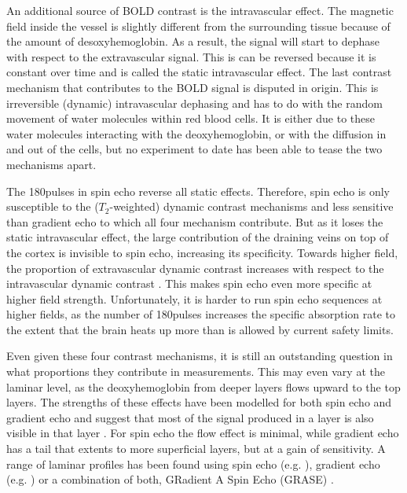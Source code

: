 An additional source of BOLD contrast is the intravascular effect. The magnetic field inside the vessel is slightly different from the surrounding tissue because of the amount of desoxyhemoglobin. As a result, the signal will start to dephase with respect to the extravascular signal. This is can be reversed because it is constant over time and is called the static intravascular effect. The last contrast mechanism that contributes to the BOLD signal is disputed in origin. This is irreversible (dynamic) intravascular dephasing and has to do with the random movement of water molecules within red blood cells. It is either due to these water molecules interacting with the deoxyhemoglobin, or with the diffusion in and out of the cells, but no experiment to date has been able to tease the two mechanisms apart.

The 180\textdegree pulses in spin echo reverse all static effects. Therefore, spin echo is only susceptible to the ($T_2$-weighted) dynamic contrast mechanisms and less sensitive than gradient echo to which all four mechanism contribute. But as it loses the static intravascular effect, the large contribution of the draining veins on top of the cortex is invisible to spin echo, increasing its specificity. Towards higher field, the proportion of extravascular dynamic contrast increases with respect to the intravascular dynamic contrast \cite{Norris2002,Jochimsen2004,Norris2006}. This makes spin echo even more specific at higher field strength. Unfortunately, it is harder to run spin echo sequences at higher fields, as the number of 180\textdegree pulses increases the specific absorption rate to the extent that the brain heats up more than is allowed by current safety limits.

Even given these four contrast mechanisms, it is still an outstanding question in what proportions they contribute in measurements. This may even vary at the laminar level, as the deoxyhemoglobin from deeper layers flows upward to the top layers. The strengths of these effects have been modelled for both spin echo and gradient echo and suggest that most of the signal produced in a layer is also visible in that layer \cite{Markuerkiaga2016,Uludag2017}. For spin echo the flow effect is minimal, while gradient echo has a tail that extents to more superficial layers, but at a gain of sensitivity. A range of laminar profiles has been found using spin echo (e.g. \cite{Zhao2004,Harel2006,Goense2006}), gradient echo (e.g. \cite{Polimeni2010,DeMartino2013,Chen2013}) or a combination of both, GRadient A Spin Echo (GRASE) \cite{Olman2012,DeMartino2013}.

